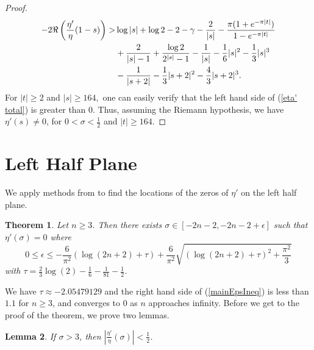 \documentclass{amsart}
\theoremstyle{plain}
\newtheorem{theorem}{Theorem}[section]
\newtheorem{lemma}[theorem]{Lemma}
\theoremstyle{definition}
\begin{document}
\begin{proof}
\begin{align}
        -2\Re\left(\frac{\eta'}{\eta}(1-s)\right)>& \log|s| +\log 2 -2 -\gamma-\frac{2}{|s|}-\frac{\pi(1+e^{-\pi|t|})}{1-e^{-\pi|t|}}\notag\\
        &+\frac{2}{|s|-1}+\frac{\log 2}{2^{|s|}-1}-\frac{1}{|s|}-\frac{1}{6}|s|^2-\frac{1}{3}|s|^3\notag\\
        &- \frac{1}{|s+2|}-\frac{1}{3}|s+2|^2-\frac{4}{3}|s+2|^3.
    \end{align}
    For $|t|\geq 2$ and $|s|\geq 164,$ one can easily verify that the left hand side of (\ref{eta' total}) is greater than 0. Thus, assuming  the Riemann hypothesis, we have $\eta'(s)\ne 0$, for $0 < \sigma < \frac{1}{2}$ and $|t|\geq 164.$
\end{proof}


\section{Left Half Plane}\label{sec eta left}

We apply methods from \cite{yildirim} to find the locations of the zeros of \(\eta'\) on the left half plane. 

\begin{theorem}\label{thm deta bound}
Let \(n\ge 3\).  Then there exists \(\sigma\in[-2n-2,-2n-2+\epsilon]\) such that \(\eta'(\sigma)=0\) where
\begin{equation}\label{mainEpsIneq}
0 \leq \epsilon \leq -\frac{6}{\pi^2}(\log(2n+2)+\tau) + \frac{6}{\pi^2}\sqrt{(\log(2n+2)+\tau)^2+\frac{\pi^2}{3}}
\end{equation}
with $\tau=\frac{2}{3}\log(2) - \frac{1}{6} - \frac{1}{81} - \frac{1}{2}$.
\end{theorem}

We have $\tau\approx -2.05479129$ and the right hand side of (\ref{mainEpsIneq}) is less
than \(1.1\) for $n\ge 3$, and converges to 0 as \(n\) approaches infinity.  
Before we get to the proof of the theorem, we prove two lemmas.

\begin{lemma}\label{lemma:LogDeriv}
If $\sigma>3$, then $\left| \frac{\eta'}{\eta}(\sigma)\right|<\frac{1}{2}$.
\end{lemma}
\end{document}
